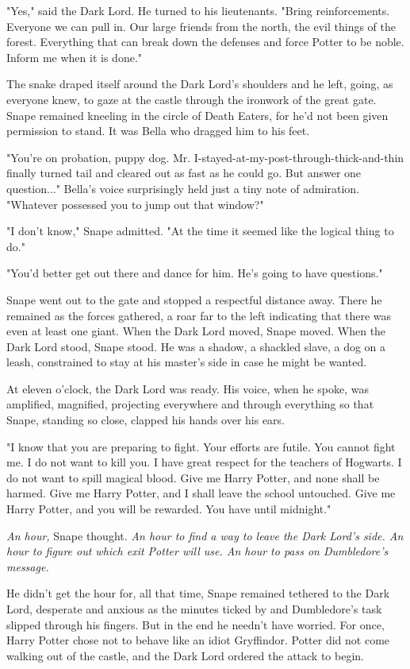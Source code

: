 "Yes," said the Dark Lord. He turned to his lieutenants. "Bring reinforcements. Everyone we can pull in. Our large friends from the north, the evil things of the forest. Everything that can break down the defenses and force Potter to be noble. Inform me when it is done."

The snake draped itself around the Dark Lord's shoulders and he left, going, as everyone knew, to gaze at the castle through the ironwork of the great gate. Snape remained kneeling in the circle of Death Eaters, for he'd not been given permission to stand. It was Bella who dragged him to his feet.

"You're on probation, puppy dog. Mr. I-stayed-at-my-post-through-thick-and-thin finally turned tail and cleared out as fast as he could go. But answer one question..." Bella's voice surprisingly held just a tiny note of admiration. "Whatever possessed you to jump out that window?"

"I don't know," Snape admitted. "At the time it seemed like the logical thing to do."

"You'd better get out there and dance for him. He's going to have questions."

Snape went out to the gate and stopped a respectful distance away. There he remained as the forces gathered, a roar far to the left indicating that there was even at least one giant. When the Dark Lord moved, Snape moved. When the Dark Lord stood, Snape stood. He was a shadow, a shackled slave, a dog on a leash, constrained to stay at his master's side in case he might be wanted.

At eleven o'clock, the Dark Lord was ready. His voice, when he spoke, was amplified, magnified, projecting everywhere and through everything so that Snape, standing so close, clapped his hands over his ears.

"I know that you are preparing to fight. Your efforts are futile. You cannot fight me. I do not want to kill you. I have great respect for the teachers of Hogwarts. I do not want to spill magical blood. Give me Harry Potter, and none shall be harmed. Give me Harry Potter, and I shall leave the school untouched. Give me Harry Potter, and you will be rewarded. You have until midnight."

\emph{An hour,} Snape thought. \emph{An hour to find a way to leave the Dark Lord's side. An hour to figure out which exit Potter will use. An hour to pass on Dumbledore's message.}

He didn't get the hour for, all that time, Snape remained tethered to the Dark Lord, desperate and anxious as the minutes ticked by and Dumbledore's task slipped through his fingers. But in the end he needn't have worried. For once, Harry Potter chose not to behave like an idiot Gryffindor. Potter did not come walking out of the castle, and the Dark Lord ordered the attack to begin.


